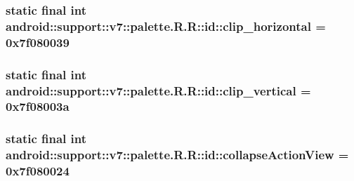 \hypertarget{classandroid_1_1support_1_1v7_1_1palette_1_1_r_1_1id_60d6a339b21a794a521a8bcbde78d257}{
\subsubsection[{clip\_\-horizontal}]{\setlength{\rightskip}{0pt plus 5cm}static final int android::support::v7::palette.R.R::id::clip\_\-horizontal = 0x7f080039}}
\label{classandroid_1_1support_1_1v7_1_1palette_1_1_r_1_1id_60d6a339b21a794a521a8bcbde78d257}


\hypertarget{classandroid_1_1support_1_1v7_1_1palette_1_1_r_1_1id_397f3ba10189774ef4e023c99bf47511}{
\subsubsection[{clip\_\-vertical}]{\setlength{\rightskip}{0pt plus 5cm}static final int android::support::v7::palette.R.R::id::clip\_\-vertical = 0x7f08003a}}
\label{classandroid_1_1support_1_1v7_1_1palette_1_1_r_1_1id_397f3ba10189774ef4e023c99bf47511}


\hypertarget{classandroid_1_1support_1_1v7_1_1palette_1_1_r_1_1id_7835c7bd22ddb98e5c13834b9909d69d}{
\subsubsection[{collapseActionView}]{\setlength{\rightskip}{0pt plus 5cm}static final int android::support::v7::palette.R.R::id::collapseActionView = 0x7f080024}}
\label{classandroid_1_1support_1_1v7_1_1palette_1_1_r_1_1id_7835c7bd22ddb98e5c13834b9909d69d}



